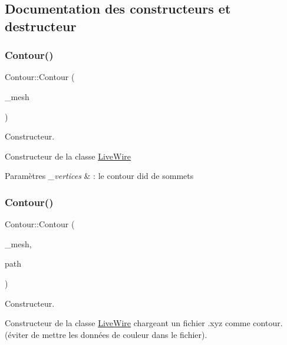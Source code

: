 \subsection{Documentation des constructeurs et destructeur}
\mbox{\label{classContour_a7522d78ab496badf3b1727202ed15492}} 
\subsubsection{\texorpdfstring{Contour()}{Contour()}\hspace{0.1cm}{\footnotesize\ttfamily [1/2]}}
{\footnotesize\ttfamily Contour\+::\+Contour (\begin{DoxyParamCaption}\item[{My\+Mesh \&}]{\+\_\+mesh }\end{DoxyParamCaption})}



Constructeur. 

Constructeur de la classe \hyperlink{classLiveWire}{Live\+Wire}


\begin{DoxyParams}{Paramètres}
{\em \+\_\+vertices} & \+: le contour d\textquotesingle{}id de sommets \\
\hline
\end{DoxyParams}
\mbox{\label{classContour_af584aa2a5e9de4660cb2bc0e187868c6}} 
\subsubsection{\texorpdfstring{Contour()}{Contour()}\hspace{0.1cm}{\footnotesize\ttfamily [2/2]}}
{\footnotesize\ttfamily Contour\+::\+Contour (\begin{DoxyParamCaption}\item[{My\+Mesh \&}]{\+\_\+mesh,  }\item[{char $\ast$}]{path }\end{DoxyParamCaption})}



Constructeur. 

Constructeur de la classe \hyperlink{classLiveWire}{Live\+Wire} chargeant un fichier .xyz comme contour. (éviter de mettre les données de couleur dans le fichier).


